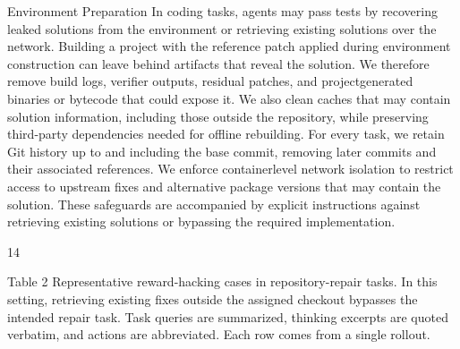 \documentclass[
  10
]{article}
\begin{document}
Environment Preparation In coding tasks, agents may pass tests by
recovering leaked solutions from the environment or retrieving existing
solutions over the network. Building a project with the reference patch
applied during environment construction can leave behind artifacts that
reveal the solution. We therefore remove build logs, verifier outputs,
residual patches, and projectgenerated binaries or bytecode that could
expose it. We also clean caches that may contain solution information,
including those outside the repository, while preserving third-party
dependencies needed for offline rebuilding. For every task, we retain Git
history up to and including the base commit, removing later commits and
their associated references. We enforce containerlevel network isolation
to restrict access to upstream fixes and alternative package versions
that may contain the solution. These safeguards are accompanied by
explicit instructions against retrieving existing solutions or bypassing
the required implementation.

14

Table 2 Representative reward-hacking cases in repository-repair tasks.
In this setting, retrieving existing fixes outside the assigned checkout
bypasses the intended repair task. Task queries are summarized, thinking
excerpts are quoted verbatim, and actions are abbreviated. Each row
comes from a single rollout.
\end{document}
